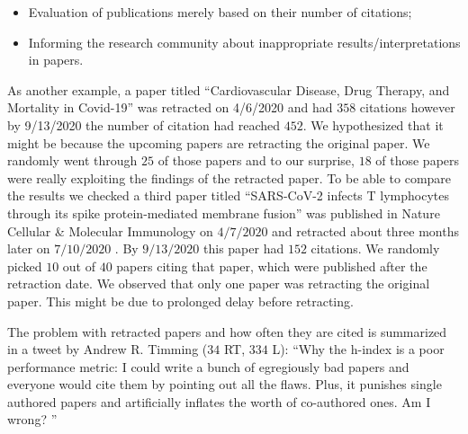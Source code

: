 \documentclass[acmsmall,authordraft]{acmart}
\begin{document}
\begin{itemize}
   \item Evaluation of publications merely based on their number of citations;
   \item Informing the research community about inappropriate results/interpretations in papers.
\end{itemize}
As another example, a paper titled ``Cardiovascular Disease, Drug Therapy, and Mortality in Covid-19'' was retracted on 4/6/2020 and had $358$ citations however by 9/13/2020 the number of citation had reached $452$. We hypothesized that it might be because the upcoming papers are retracting the original paper. We randomly went through $25$ of those papers and to our surprise, $18$ of those papers were really exploiting the findings of the retracted paper. 
To be able to compare the results we checked a third paper titled ``SARS-CoV-2 infects T lymphocytes through its spike protein-mediated membrane fusion'' was published in Nature Cellular \& Molecular Immunology on $4/7/2020$ and retracted about three months later on $7/10/2020$ \citep{wang2020sars}. By $9/13/2020$ this paper had $152$ citations. We randomly picked $10$ out of $40$ papers citing that paper, which were published after the retraction date. We observed that only one paper was retracting the original paper. This might be due to prolonged delay before retracting.


The problem with retracted papers and how often they are cited is summarized in a tweet by Andrew R. Timming ($34$ RT, $334$ L): ``Why the h-index is a poor performance metric: I could write a bunch of egregiously bad papers and everyone would cite them by pointing out all the flaws. Plus, it punishes single authored papers and artificially inflates the worth of co-authored ones. Am I wrong? \citep{timming_2020}''





\end{document}
